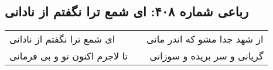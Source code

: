 \begin{center}
\section*{رباعی شماره ۴۰۸: ای شمع ترا نگفتم از نادانی}
\label{sec:sh408}
\begin{longtable}{l p{0.5cm} r}
ای شمع ترا نگفتم از نادانی
&&
از شهد جدا مشو که اندر مانی
\\
تا لاجرم اکنون تو و بی فرمانی
&&
گریانی و سر بریده و سوزانی
\\
\end{longtable}
\end{center}
